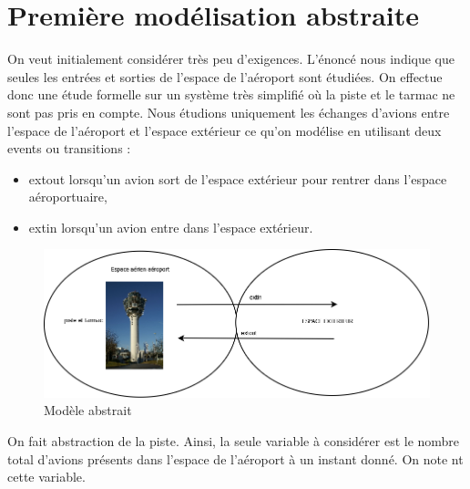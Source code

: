 \section{Première modélisation abstraite}
	

   On veut initialement considérer très peu d'exigences. L'énoncé nous indique
   que seules les entrées et sorties de l'espace de l'aéroport sont étudiées. On effectue donc une étude formelle sur un système très simplifié où la piste et le tarmac ne sont pas pris en compte. Nous étudions uniquement les échanges d'avions entre l'espace de l'aéroport et l'espace extérieur ce qu'on modélise en utilisant deux events ou transitions :
   
   \begin{itemize}
   	\item extout lorsqu'un avion sort de l'espace extérieur pour rentrer dans l'espace aéroportuaire,
   	\item extin lorsqu'un avion entre dans l'espace extérieur.
   \end{itemize} 

\begin{figure}[H]
	\begin{center}	
		\includegraphics[scale=0.4]{images/mod0}
		\caption{Modèle abstrait}
		\label{mod0}
	\end{center}
\end{figure}

On fait abstraction de la piste. Ainsi, la seule variable à considérer est le nombre total d'avions présents dans l'espace de l'aéroport à un instant donné. On note nt cette variable.

